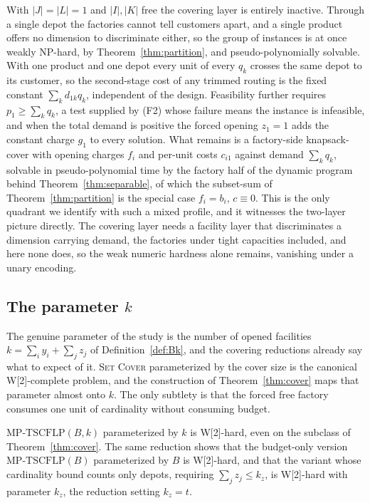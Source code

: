 \begin{observation}\label{obs:quadrant}
With $|J|=|L|=1$ and $|I|,|K|$ free the covering layer is entirely
inactive. Through a single depot the factories cannot tell customers
apart, and a single product offers no dimension to discriminate either,
so the group of instances is at once weakly NP-hard, by
Theorem~\ref{thm:partition}, and pseudo-polynomially solvable. With one
product and one depot every unit of every $q_{k}$ crosses the same depot
to its customer, so the second-stage cost of any trimmed routing is the fixed constant
$\sum_k d_{1k}q_{k}$, independent of the design. Feasibility further
requires $p_1\ge\sum_k q_k$, a test supplied by (F2) whose
failure means the instance is infeasible, and when the total demand is
positive the forced opening $z_1=1$ adds the constant charge $g_1$ to
every solution. What remains is a
factory-side knapsack-cover with opening charges $f_i$ and per-unit costs
$c_{i1}$ against demand $\sum_k q_k$, solvable in pseudo-polynomial time
by the factory half of the dynamic program behind
Theorem~\ref{thm:separable}, of which the subset-sum of
Theorem~\ref{thm:partition} is the special case $f_i=b_i$, $c\equiv 0$. This is the only quadrant we identify with such
a mixed profile, and it witnesses the two-layer picture directly. The
covering layer needs a facility layer that discriminates a dimension
carrying demand, the factories under tight capacities included, and
here none does, so the weak numeric hardness alone remains, vanishing
under a unary encoding.
\end{observation}

\subsection{The parameter \texorpdfstring{$k$}{k}}\label{sec:paramk}

The genuine parameter of the study is the number of opened facilities
$k=\sum_i y_i+\sum_j z_j$ of Definition~\ref{def:Bk}, and the covering
reductions already say what to expect of it. \textsc{Set Cover}
parameterized by the cover size is the canonical W[2]-complete problem,
and the construction of Theorem~\ref{thm:cover} maps that parameter
almost onto $k$. The only subtlety is that the forced free factory
consumes one unit of cardinality without consuming budget.

\begin{theorem}\label{thm:w2}
$\mathrm{MP\text{-}TSCFLP}(B,k)$ parameterized by $k$ is W[2]-hard, even
on the subclass of Theorem~\ref{thm:cover}. The same reduction shows that
the budget-only version $\mathrm{MP\text{-}TSCFLP}(B)$ parameterized by
$B$ is W[2]-hard, and that the variant whose cardinality bound counts only depots, requiring
$\sum_j z_j\le k_z$, is W[2]-hard with parameter $k_z$, the reduction
setting $k_z=t$.
\end{theorem}

